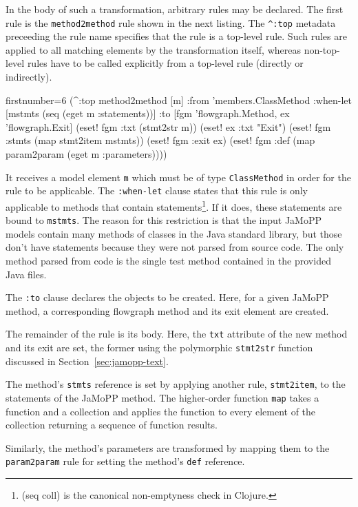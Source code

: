 \documentclass[11pt]{article}
\begin{document}
In the body of such a transformation, arbitrary rules may be declared.  The
first rule is the \verb|method2method| rule shown in the next listing.  The
\verb|^:top| metadata preceeding the rule name specifies that the rule is a
top-level rule.  Such rules are applied to all matching elements by the
transformation itself, whereas non-top-level rules have to be called explicitly
from a top-level rule (directly or indirectly).

\begin{clojurecode*}{firstnumber=6}
  (^:top method2method [m]
      :from 'members.ClassMethod
      :when-let [mstmts (seq (eget m :statements))]
      :to [fgm 'flowgraph.Method, ex 'flowgraph.Exit]
      (eset! fgm :txt (stmt2str m))
      (eset! ex :txt "Exit")
      (eset! fgm :stmts (map stmt2item mstmts))
      (eset! fgm :exit ex)
      (eset! fgm :def (map param2param (eget m :parameters))))
\end{clojurecode*}

It receives a model element \verb|m| which must be of type \verb|ClassMethod|
in order for the rule to be applicable.  The \verb|:when-let| clause states
that this rule is only applicable to methods that contain
statements\footnote{\textsf{(seq coll)} is the canonical non-emptyness check in
  Clojure.}.  If it does, these statements are bound to \verb|mstmts|.  The
reason for this restriction is that the input JaMoPP models contain many
methods of classes in the Java standard library, but those don't have
statements because they were not parsed from source code.  The only method
parsed from code is the single test method contained in the provided Java
files.

The \verb|:to| clause declares the objects to be created.  Here, for a given
JaMoPP method, a corresponding flowgraph method and its exit element are
created.

The remainder of the rule is its body.  Here, the \verb|txt| attribute of the
new method and its exit are set, the former using the polymorphic
\verb|stmt2str| function discussed in Section~\ref{sec:jamopp-text}.

The method's \verb|stmts| reference is set by applying another rule,
\verb|stmt2item|, to the statements of the JaMoPP method.  The higher-order
function \verb|map| takes a function and a collection and applies the function
to every element of the collection returning a sequence of function results.

Similarly, the method's parameters are transformed by mapping them to the
\verb|param2param| rule for setting the method's \verb|def| reference.
\end{document}
